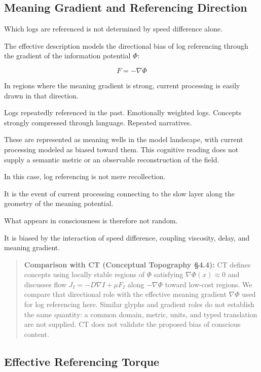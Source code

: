 \subsection{Meaning Gradient and Referencing Direction}


Which logs are referenced is not determined by speed difference alone.

The effective description models the directional bias of log referencing through the gradient of the information potential $\Phi$:

\begin{equation}
F = -\nabla \Phi
\end{equation}

In regions where the meaning gradient is strong, current processing is easily drawn in that direction.

Logs repeatedly referenced in the past. Emotionally weighted logs. Concepts strongly compressed through language. Repeated narratives.

These are represented as meaning wells in the model landscape, with current processing modeled as biased toward them. This cognitive reading does not supply a semantic metric or an observable reconstruction of the field.

In this case, log referencing is not mere recollection.

It is the event of current processing connecting to the slow layer along the geometry of the meaning potential.

What appears in consciousness is therefore not random.

It is biased by the interaction of speed difference, coupling viscosity, delay, and meaning gradient.

\begin{quote}
\textbf{Comparison with CT (Conceptual Topography §4.4):} CT defines concepts using locally stable regions of $\Phi$ satisfying $\nabla\Phi(x)\approx 0$ and discusses flow $J_I = -D\nabla I + \mu F_I$ along $-\nabla\Phi$ toward low-cost regions. We compare that directional role with the effective meaning gradient $\nabla\Phi$ used for log referencing here. Similar glyphs and gradient roles do not establish the same quantity: a common domain, metric, units, and typed translation are not supplied. CT does not validate the proposed bias of conscious content.
\end{quote}

\subsection{Effective Referencing Torque}


